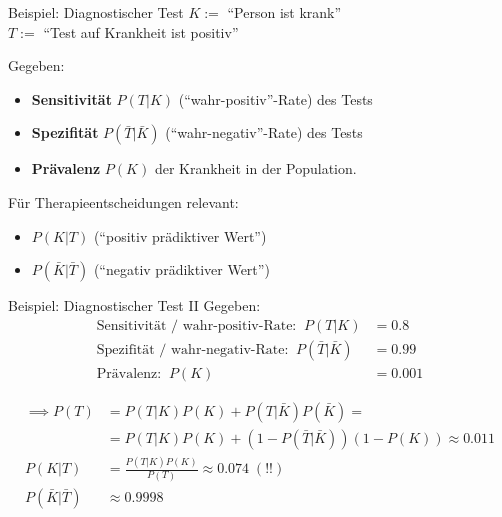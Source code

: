 \documentclass[
  10pt,
  ignorenonframetext,
]{beamer}
\providecommand{\tightlist}{%
  \setlength{\itemsep}{0pt}\setlength{\parskip}{0pt}}
\begin{document}
\begin{frame}{Beispiel: Diagnostischer Test}
\protect\hypertarget{beispiel-diagnostischer-test}{}
\(K:=\) ``Person ist krank''\\
\(T:=\) ``Test auf Krankheit ist positiv''

Gegeben:

\begin{itemize}
\tightlist
\item
  \textbf{Sensitivität} \(P(T|K)\) (``wahr-positiv''-Rate) des Tests
\item
  \textbf{Spezifität} \(P(\bar{T}|\bar{K})\) (``wahr-negativ''-Rate) des
  Tests
\item
  \textbf{Prävalenz} \(P(K)\) der Krankheit in der Population.
\end{itemize}

Für Therapieentscheidungen relevant:

\begin{itemize}
\tightlist
\item
  \(P(K|T)\) (``positiv prädiktiver Wert'')
\item
  \(P(\bar K|\bar T)\) (``negativ prädiktiver Wert'')
\end{itemize}
\end{frame}

\begin{frame}{Beispiel: Diagnostischer Test II}
\protect\hypertarget{beispiel-diagnostischer-test-ii}{}
Gegeben: \begin{align*}
\text{Sensitivität / wahr-positiv-Rate:} \;\;P(T|K) &= 0.8 \\
\text{Spezifität / wahr-negativ-Rate:}\;\; P(\bar{T}|\bar{K}) &= 0.99 \\
\text{Prävalenz:} \;\; P(K) &= 0.001
\end{align*}

\begin{align*}
\implies P(T)  & =  P(T|K)P(K) + P(T|\bar{K})P(\bar{K})  =  \\
      & = P(T|K)P(K) + (1-P(\bar{T}|\bar{K}))(1-P(K)) \approx  0.011 \\
P(K|T) & =  \frac{P(T|K)P(K)}{P(T)} \approx  0.074 \; (!!)  \\
P(\bar{K}|\bar{T}) &\approx  0.9998
\end{align*}
\end{frame}
\end{document}
